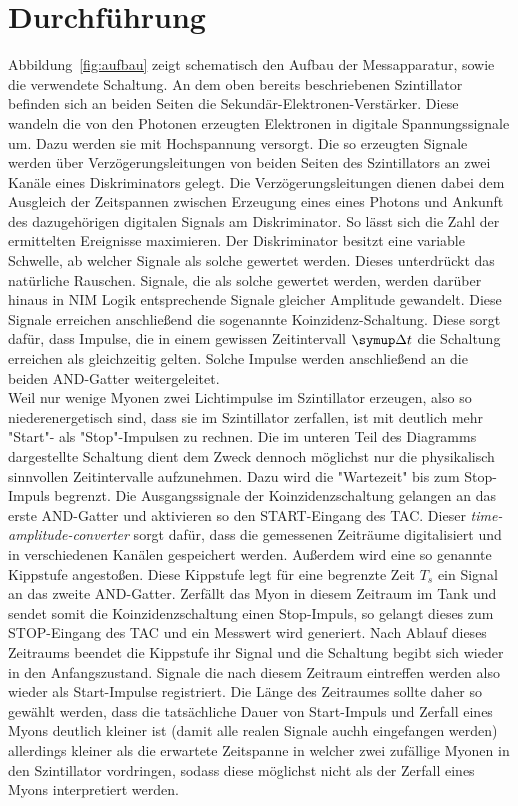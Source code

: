 \section{Durchführung}
\label{sec:durchführung}

Abbildung~\ref{fig:aufbau} zeigt schematisch den Aufbau der Messapparatur, sowie die verwendete Schaltung. An dem oben bereits beschriebenen Szintillator befinden sich an beiden Seiten die Sekundär-Elektronen-Verstärker. Diese wandeln die von den Photonen erzeugten Elektronen in digitale Spannungssignale um. Dazu werden sie mit Hochspannung versorgt. Die so erzeugten Signale werden über Verzögerungsleitungen von beiden Seiten des Szintillators an zwei Kanäle eines Diskriminators gelegt. Die Verzögerungsleitungen dienen dabei dem Ausgleich der Zeitspannen zwischen Erzeugung eines eines Photons und Ankunft des dazugehörigen digitalen Signals am Diskriminator. So lässt sich die Zahl der ermittelten Ereignisse maximieren. Der Diskriminator besitzt eine variable Schwelle, ab welcher Signale als solche gewertet werden. Dieses unterdrückt das natürliche Rauschen. Signale, die als solche gewertet werden, werden darüber hinaus in NIM Logik entsprechende Signale gleicher Amplitude gewandelt. Diese Signale erreichen anschließend die sogenannte Koinzidenz-Schaltung. Diese sorgt dafür, dass Impulse, die in einem gewissen Zeitintervall $\upD t$ die Schaltung erreichen als gleichzeitig gelten. Solche Impulse werden anschließend an die beiden AND-Gatter weitergeleitet. \\
Weil nur wenige Myonen zwei Lichtimpulse im Szintillator erzeugen, also so niederenergetisch sind, dass sie im Szintillator zerfallen, ist mit deutlich mehr "Start"- als "Stop"-Impulsen zu rechnen. Die im unteren Teil des Diagramms dargestellte Schaltung dient dem Zweck dennoch möglichst nur die physikalisch sinnvollen Zeitintervalle aufzunehmen. Dazu wird die "Wartezeit" bis zum Stop-Impuls begrenzt. Die Ausgangssignale der Koinzidenzschaltung gelangen an das erste AND-Gatter und aktivieren so den START-Eingang des TAC. Dieser \textit{time-amplitude-converter} sorgt dafür, dass die gemessenen Zeiträume digitalisiert und in verschiedenen Kanälen gespeichert werden. Außerdem wird eine so genannte Kippstufe angestoßen. Diese Kippstufe legt für eine begrenzte Zeit $T_s$ ein Signal an das zweite AND-Gatter. Zerfällt das Myon in diesem Zeitraum im Tank und sendet somit die Koinzidenzschaltung einen Stop-Impuls, so gelangt dieses zum STOP-Eingang des TAC und ein Messwert wird generiert. Nach Ablauf dieses Zeitraums beendet die Kippstufe ihr Signal und die Schaltung begibt sich wieder in den Anfangszustand. Signale die nach diesem Zeitraum eintreffen werden also wieder als Start-Impulse registriert. Die Länge des Zeitraumes sollte daher so gewählt werden, dass die tatsächliche Dauer von Start-Impuls und Zerfall eines Myons deutlich kleiner ist (damit alle realen Signale auchh eingefangen werden) allerdings kleiner als die erwartete Zeitspanne in welcher zwei zufällige Myonen in den Szintillator vordringen, sodass diese möglichst nicht als der Zerfall eines Myons interpretiert werden.
